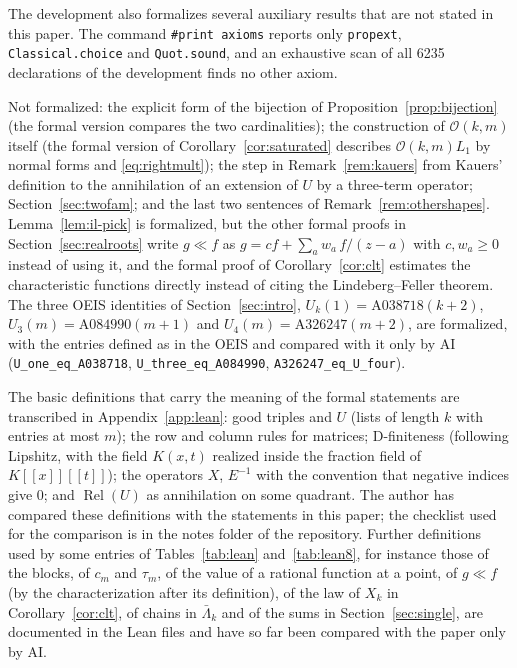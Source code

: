 \documentclass[11pt]{amsart}
\theoremstyle{definition}
\newcommand{\lean}[1]{\texttt{#1}}
\newcommand{\cO}{\mathcal{O}}
\DeclareMathOperator{\Rel}{Rel}
\begin{document}
\begin{sloppypar}
The development also formalizes several auxiliary results that are not stated in this paper. The command \lean{\#print axioms} reports only \lean{propext}, \lean{Classical.choice} and \lean{Quot.sound}, and an exhaustive scan of all 6235 declarations of the development finds no other axiom.
\end{sloppypar}

Not formalized: the explicit form of the bijection of Proposition~\ref{prop:bijection} (the formal version compares the two cardinalities); the construction of $\cO(k,m)$ itself (the formal version of Corollary~\ref{cor:saturated} describes $\cO(k,m)L_1$ by normal forms and \eqref{eq:rightmult}); the step in Remark~\ref{rem:kauers} from Kauers' definition to the annihilation of an extension of $U$ by a three-term operator; Section~\ref{sec:twofam}; and the last two sentences of Remark~\ref{rem:othershapes}. Lemma~\ref{lem:il-pick} is formalized, but the other formal proofs in Section~\ref{sec:realroots} write $g\ll f$ as $g=cf+\sum_aw_a\,f/(z-a)$ with $c,w_a\ge0$ instead of using it, and the formal proof of Corollary~\ref{cor:clt} estimates the characteristic functions directly instead of citing the Lindeberg--Feller theorem. The three OEIS identities of Section~\ref{sec:intro}, $U_k(1)=\text{A038718}(k+2)$, $U_3(m)=\text{A084990}(m+1)$ and $U_4(m)=\text{A326247}(m+2)$, are formalized, with the entries defined as in the OEIS and compared with it only by AI (\lean{U\_one\_eq\_A038718}, \lean{U\_three\_eq\_A084990}, \lean{A326247\_eq\_U\_four}).

The basic definitions that carry the meaning of the formal statements are transcribed in Appendix~\ref{app:lean}: good triples and $U$ (lists of length $k$ with entries at most $m$); the row and column rules for matrices; D-finiteness (following Lipshitz, with the field $K(x,t)$ realized inside the fraction field of $K[[x]][[t]]$); the operators $X$, $E^{-1}$ with the convention that negative indices give $0$; and $\Rel(U)$ as annihilation on some quadrant. The author has compared these definitions with the statements in this paper; the checklist used for the comparison is in the notes folder of the repository. Further definitions used by some entries of Tables~\ref{tab:lean} and~\ref{tab:lean8}, for instance those of the blocks, of $c_m$ and $\tau_m$, of the value of a rational function at a point, of $g\ll f$ (by the characterization after its definition), of the law of $X_k$ in Corollary~\ref{cor:clt}, of chains in $\bar\Lambda_k$ and of the sums in Section~\ref{sec:single}, are documented in the Lean files and have so far been compared with the paper only by AI.
\end{document}
